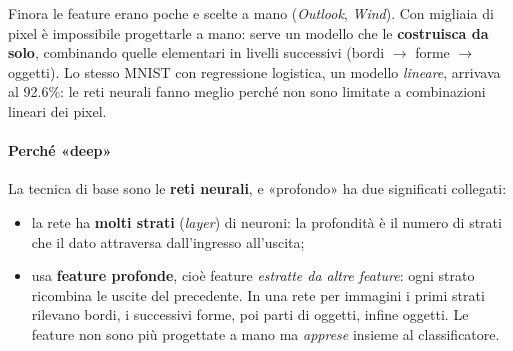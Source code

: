 \documentclass[12pt]{extarticle}
\begin{document}
\noindent Finora le feature erano poche e scelte a mano (\emph{Outlook}, \emph{Wind}). Con migliaia di pixel è impossibile progettarle a mano: serve un modello che le \textbf{costruisca da solo}, combinando quelle elementari in livelli successivi (bordi $\to$ forme $\to$ oggetti). Lo stesso MNIST con regressione logistica, un modello \emph{lineare}, arrivava al 92.6\%: le reti neurali fanno meglio perché non sono limitate a combinazioni lineari dei pixel.

\paragraph{Perché «deep»}
La tecnica di base sono le \textbf{reti neurali}, e «profondo» ha due significati collegati:
\begin{itemize}
    \item la rete ha \textbf{molti strati} (\emph{layer}) di neuroni: la profondità è il numero di strati che il dato attraversa dall'ingresso all'uscita;
    \item usa \textbf{feature profonde}, cioè feature \emph{estratte da altre feature}: ogni strato ricombina le uscite del precedente. In una rete per immagini i primi strati rilevano bordi, i successivi forme, poi parti di oggetti, infine oggetti. Le feature non sono più progettate a mano ma \emph{apprese} insieme al classificatore.
\end{itemize}

\begin{center}
\end{center}
\end{document}
